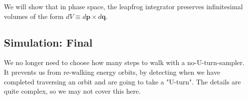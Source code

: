 \documentclass[titlepage]{article}
\newcommand{\p}{\mathbf{p}}
\newcommand{\q}{\mathbf{q}}
\newcommand{\m}{\mathbf{m}}
\begin{document}
We will show that in phase space, the leapfrog integrator preserves infinitesimal
volumes of the form $dV \equiv d\p \times d\q$.


\subsection{Simulation: Final}


We no longer need to choose how many steps to walk with a no-U-turn-sampler.
It prevents us from re-walking energy orbits, by detecting when we have completed
traversing an orbit and are going to take a "U-turn". The details are quite
complex, so we may not cover this here.

% 
% 
% 
% 
% 
% 
% 
\end{document}
